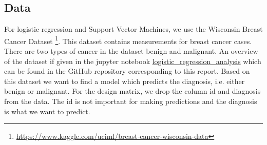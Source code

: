 \subsection{Data} \label{subsec:data_logistic_regression}
For logistic regression and Support Vector Machines, we use the Wisconsin Breast Cancer Dataset \footnote{\url{https://www.kaggle.com/uciml/breast-cancer-wisconsin-data}}. This dataset contains measurements for breast cancer cases. There are two types of cancer in the dataset benign and malignant. An overview of the dataset if given in the jupyter notebook \href{https://github.com/am-kaiser/CompSci-Project-1/blob/main/regression_analysis/examples/logistic_regression_analysis.ipynb}{logistic\_regression\_analysis} which can be found in the GitHub repository corresponding to this report. Based on this dataset we want to find a model which predicts the diagnosis, i.e. either benign or malignant. For the design matrix, we drop the column id and diagnosis from the data. The id is not important for making predictions and the diagnosis is what we want to predict.